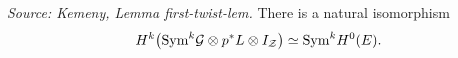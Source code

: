 \begin{lemma}
  \label{lem:kemeny_first_twist}
  \textit{Source: Kemeny, Lemma first-twist-lem.}
  There is a natural isomorphism
  \[
    H^k\bigl(\mathrm{Sym}^k\mathcal{G}\otimes p^*L\otimes I_{\mathcal{Z}}\bigr)\simeq \mathrm{Sym}^kH^0(E).
  \]
\end{lemma}

